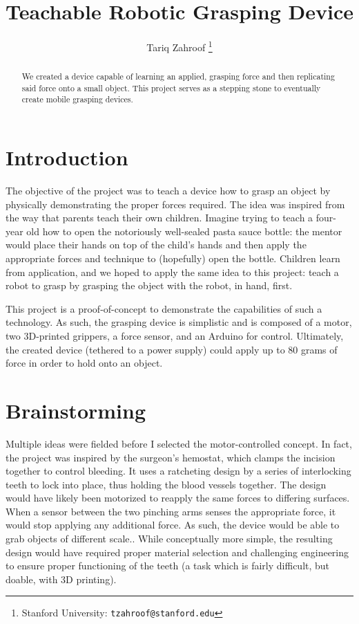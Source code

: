 \documentclass[letterpaper, 10 pt, conference]{ieeeconf}  %
\title{\LARGE \bf
Teachable Robotic Grasping Device
}
\author{Tariq Zahroof%
\thanks{Stanford University:
        {\tt tzahroof@stanford.edu}}%
}
\begin{document}
\maketitle
\thispagestyle{empty}
\pagestyle{empty}


\begin{abstract}

We created a device capable of learning an applied, grasping force and then replicating said force onto a small object. This project serves as a stepping stone to eventually create mobile grasping devices.

\end{abstract}


\section{Introduction}

The objective of the project was to teach a device how to grasp an object by physically demonstrating the proper forces required. The idea was inspired from the way that parents teach their own children. Imagine trying to teach a four-year old how to open the notoriously well-sealed pasta sauce bottle: the mentor would place their hands on top of the child's hands and then apply the appropriate forces and technique to (hopefully) open the bottle. Children learn from application, and we hoped to apply the same idea to this project: teach a robot to grasp by grasping the object with the robot, in hand, first.

This project is a proof-of-concept to demonstrate the capabilities of such a technology. As such, the grasping device is simplistic and is composed of a motor, two 3D-printed grippers, a force sensor, and an Arduino for control. Ultimately, the created device (tethered to a power supply) could apply up to 80 grams of force in order to hold onto an object.



\section{Brainstorming}

Multiple ideas were fielded before I selected the motor-controlled concept. In fact, the project was inspired by the surgeon's hemostat, which clamps the incision together to control bleeding. It uses a ratcheting design by a series of interlocking teeth to lock into place, thus holding the blood vessels together. The design would have likely been motorized to reapply the same forces to differing surfaces. When a sensor between the two pinching arms senses the appropriate force, it would stop applying any additional force. As such, the device would be able to grab objects of different scale.. While conceptually more simple, the resulting design would have required proper material selection and challenging engineering to ensure proper functioning of the teeth (a task which is fairly difficult, but doable, with 3D printing).
\end{document}
